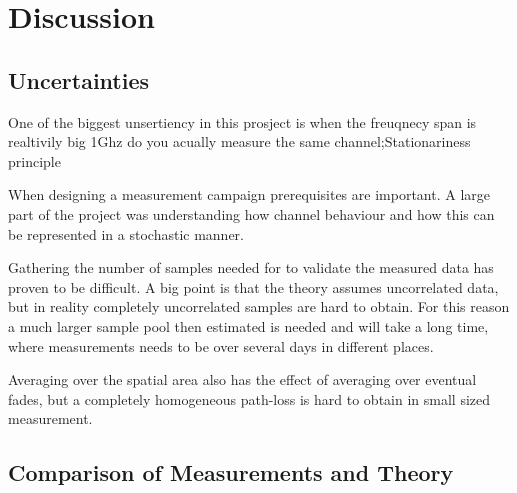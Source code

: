 \chapter{Discussion}
\section{Uncertainties}
One of the biggest unsertiency in this prosject is when the freuqnecy span is realtivily big 1Ghz do you acually measure the same channel;Stationariness principle

When designing a measurement campaign prerequisites are important. A large part of the project was understanding how channel behaviour and how this can be represented in a stochastic manner. 

Gathering the number of samples needed for to validate the measured data has proven to be difficult. A big point is that the theory assumes uncorrelated data, but in reality completely uncorrelated samples are hard to obtain. For this reason a much larger sample pool then estimated is needed and will take a long time, where measurements needs to be over several days in different places.

Averaging over the spatial  area also has the effect of averaging over eventual fades, but a completely homogeneous path-loss is hard to obtain in small sized measurement.

\section{Comparison of Measurements and Theory}
